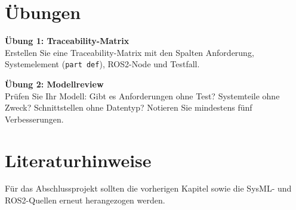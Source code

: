 \section{Übungen}
\begin{uebungbox}
\textbf{Übung 1: Traceability-Matrix}\\
Erstellen Sie eine Traceability-Matrix mit den Spalten Anforderung, Systemelement (\texttt{part def}), ROS2-Node und Testfall.
\end{uebungbox}

\begin{uebungbox}
\textbf{Übung 2: Modellreview}\\
Prüfen Sie Ihr Modell: Gibt es Anforderungen ohne Test? Systemteile ohne Zweck? Schnittstellen ohne Datentyp? Notieren Sie mindestens fünf Verbesserungen.
\end{uebungbox}

\section{Literaturhinweise}
Für das Abschlussprojekt sollten die vorherigen Kapitel sowie die SysML- und ROS2-Quellen \cite{delligatti2014,friedenthal2014,ros2docs} erneut herangezogen werden.

